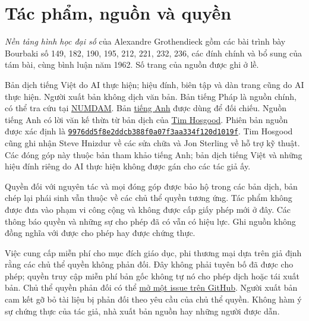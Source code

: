 \chapter*{Tác phẩm, nguồn và quyền}
\textit{Nền tảng hình học đại số} của Alexandre Grothendieck gồm các bài trình bày
Bourbaki số 149, 182, 190, 195, 212, 221, 232, 236, các đính chính và bổ sung
của tám bài, cùng bình luận năm 1962. Số trang của nguồn được ghi ở lề.
\editiondescription

Bản dịch tiếng Việt do AI thực hiện; hiệu đính, biên tập và dàn trang cũng do AI
thực hiện. Người xuất bản không dịch văn bản. Bản tiếng Pháp là nguồn chính,
có thể tra cứu tại \href{https://www.numdam.org/}{NUMDAM}. Bản
\href{https://github.com/KokunoYumeto/fga-en}{tiếng Anh} được dùng để đối chiếu.
Nguồn tiếng Anh có lời văn kế thừa từ bản dịch của \href{https://github.com/thosgood/fga}{Tim Hosgood}.
Phiên bản nguồn được xác định là
\href{https://github.com/thosgood/fga/tree/9976dd5f8e2ddcb388f0a07f3aa334f120d1019f}{\nolinkurl{9976dd5f8e2ddcb388f0a07f3aa334f120d1019f}}.
Tim Hosgood cũng ghi nhận Steve Hnizdur về các sửa chữa và Jon Sterling về hỗ trợ kỹ thuật.
Các đóng góp này thuộc bản tham khảo tiếng Anh; bản dịch tiếng Việt và những
hiệu đính riêng do AI thực hiện không được gán cho các tác giả ấy.

Quyền đối với nguyên tác và mọi đóng góp được bảo hộ trong các bản dịch, bản
chép lại phái sinh vẫn thuộc về các chủ thể quyền tương ứng. Tác phẩm không được
đưa vào phạm vi công cộng và không được cấp giấy phép mới ở đây. Các thông báo
quyền và những sự cho phép đã có vẫn có hiệu lực. Ghi nguồn không đồng nghĩa với
được cho phép hay được chứng thực.

Việc cung cấp miễn phí cho mục đích giáo dục, phi thương mại dựa trên giả định
rằng các chủ thể quyền không phản đối. Đây không phải tuyên bố đã được cho phép;
quyền truy cập miễn phí bản gốc không tự nó cho phép dịch hoặc tái xuất bản.
Chủ thể quyền phản đối có thể \href{https://github.com/KokunoYumeto/ega-fga-sga-vi/issues}{mở một issue trên GitHub}.
Người xuất bản cam kết gỡ bỏ tài liệu bị phản đối theo yêu cầu của chủ thể quyền.
Không hàm ý sự chứng thực của tác giả, nhà xuất bản nguồn hay những người được dẫn.
\clearpage
